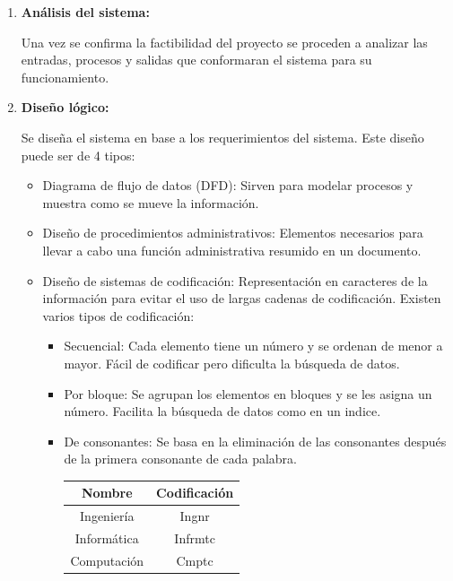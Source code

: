 \documentclass{templateNote}
\begin{document}
\begin{enumerate}
    \item \hypertarget{ana_sis}{\textbf{Análisis del sistema:}} Una vez se confirma la factibilidad del proyecto se proceden a analizar las entradas, procesos y salidas que conformaran el sistema para su funcionamiento.
    \item \hypertarget{dis_log}{\textbf{Diseño lógico:}} Se diseña el sistema en base a los requerimientos del sistema. Este diseño puede ser de 4 tipos:
        \begin{itemize}
            \item Diagrama de flujo de datos (DFD): Sirven para modelar procesos y muestra como se mueve la información.
            \item Diseño de procedimientos administrativos: Elementos necesarios para llevar a cabo una función administrativa resumido en un documento.
            \item Diseño de sistemas de codificación: Representación en caracteres de la información para evitar el uso de largas cadenas de codificación. Existen varios tipos de codificación:
            \begin{itemize}
                \item Secuencial: Cada elemento tiene un número y se ordenan de menor a mayor. Fácil de codificar pero dificulta la búsqueda de datos.
                \item Por bloque: Se agrupan los elementos en bloques y se les asigna un número. Facilita la búsqueda de datos como en un indice.
                \item De consonantes: Se basa en la eliminación de las consonantes después de la primera consonante de cada palabra.
                \begin{tcolorbox}[colback=green!10!white,colframe=green!75!black,title=Ejemplo de codificación de consonantes]
                    \begin{center}
                        \begin{tabular}{|c|c|}
                            \hline
                            \textbf{Nombre} & \textbf{Codificación} \\ \hline
                            Ingeniería & Ingnr \\ \hline
                            Informática & Infrmtc \\ \hline
                            Computación & Cmptc \\ \hline
                        \end{tabular}
                    \end{center}

\end{tcolorbox}
\end{itemize}
\end{itemize}
\end{enumerate}
\end{document}
